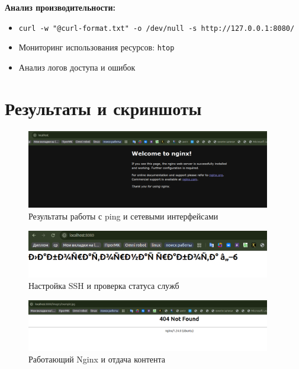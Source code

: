 \textbf{Анализ производительности:}
\begin{itemize}
    \item \texttt{curl -w "@curl-format.txt" -o /dev/null -s http://127.0.0.1:8080/}
    \item Мониторинг использования ресурсов: \texttt{htop}
    \item Анализ логов доступа и ошибок
\end{itemize}

\section{Результаты и скриншоты}

\begin{figure}[H]
    \centering
    \includegraphics[width=0.95\textwidth]{images/image.png}
    \caption{Результаты работы с ping и сетевыми интерфейсами}
    \label{fig:ping_network}
\end{figure}

\begin{figure}[H]
    \centering
    \includegraphics[width=0.95\textwidth]{images/image2.png}
    \caption{Настройка SSH и проверка статуса служб}
    \label{fig:ssh_setup}
\end{figure}

\begin{figure}[H]
    \centering
    \includegraphics[width=0.95\textwidth]{images/image3.png}
    \caption{Работающий Nginx и отдача контента}
    \label{fig:nginx_working}
\end{figure}

